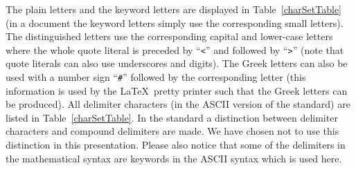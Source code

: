 \documentclass[\pformat,12pt]{article}
\begin{document}
The plain letters and the keyword letters are displayed in
Table~\ref{charSetTable} (in a document the keyword letters simply use the
corresponding small letters). The distinguished letters use the
corresponding capital and lower-case
letters where the whole quote literal is preceded by
``{\tt <}'' and followed by ``{\tt >}'' (note that quote literals
can also use underscores and digits). The Greek letters can also be used
with a number sign ``{\tt \#}'' followed by the corresponding letter (this
information is used by the \LaTeX\ pretty printer such that the Greek letters
can be produced). All delimiter characters (in the ASCII version of the
standard) are listed in Table~\ref{charSetTable}. In the standard a
distinction between delimiter characters and compound delimiters are
made.
We have
chosen not to use this distinction in this presentation. Please also notice
that some of the delimiters in the mathematical syntax are keywords in the
ASCII syntax which is used here.
\end{document}
